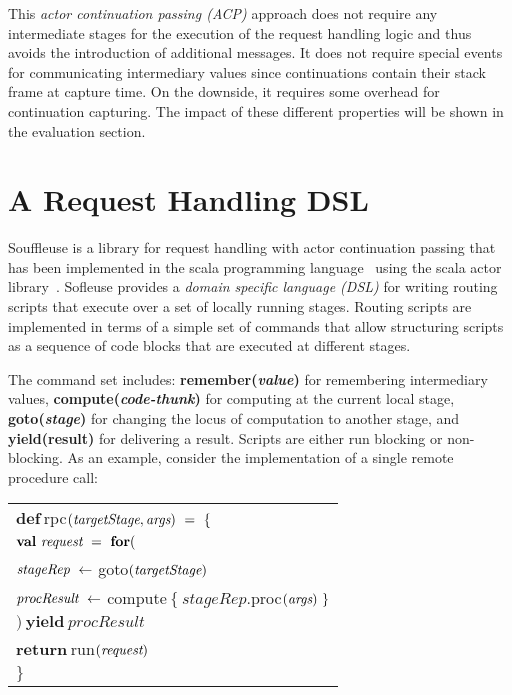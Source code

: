 \documentclass{sig-alternate}
\begin{document}
This \emph{actor continuation passing (ACP)} approach does not require any intermediate stages for
the execution of the request handling logic and thus avoids the introduction of additional messages.
It does not require special events for communicating intermediary values since continuations contain
their stack frame at capture time. On the downside, it requires some overhead for continuation
capturing. The impact of these different properties will be shown in the evaluation section.


\section{A Request Handling DSL}

Souffleuse is a library for request handling with actor continuation passing that has been
implemented in the scala programming language~\cite{Odersky:2004} using the scala actor
library~\cite{Haller:2007}. Sofleuse provides a \emph{domain specific language (DSL)} for writing
routing scripts that execute over a set of locally running stages. Routing scripts are implemented
in terms of a simple set of commands that allow structuring scripts as a sequence of code blocks
that are executed at different stages.

The command set includes: \textbf{remember(\emph{value})} for remembering intermediary values,
\textbf{compute(\emph{code-thunk})} for computing at the current local stage, \textbf{goto(\emph{stage})}
for changing the locus of computation to another stage, and \textbf{yield(result)} for delivering a
result. Scripts are either run blocking or non-blocking. As an example, consider the implementation
of a single remote procedure call:
                    
\medskip   
{\footnotesize\begin{tabular}{l}           
$\textbf{def}\ $rpc$(\emph{targetStage}, \emph{args})\ =\ \{$\\	
\hspace{2ex} $\textbf{val}\ \emph{request}\ =\ \textbf{for} ($\\
\hspace{6ex} $\emph{stageRep}\ \leftarrow\ $goto$(\emph{targetStage})$\\
\hspace{6ex} $\emph{procResult}\ \leftarrow\ $compute$\ \{\ stageRep.$proc$(\emph{args})\ \}$\\
\hspace{2ex} $)\ \textbf{yield}\ procResult$\\
\hspace{2ex} $\textbf{return}\ $run$(\emph{request})$\\   
$\}$\\
\end{tabular}}
\medskip
\end{document}
